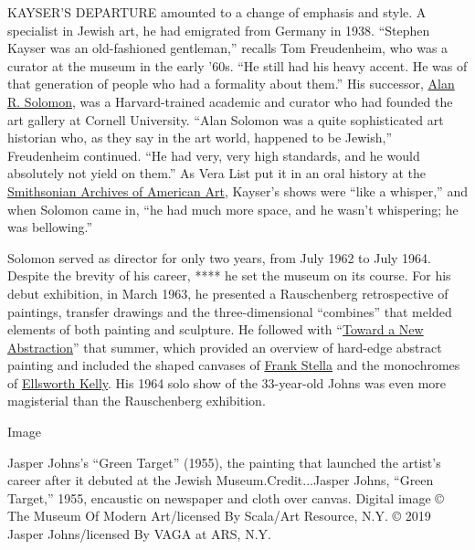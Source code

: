 KAYSER'S DEPARTURE amounted to a change of emphasis and style. A
specialist in Jewish art, he had emigrated from Germany in 1938.
``Stephen Kayser was an old-fashioned gentleman,'' recalls Tom
Freudenheim, who was a curator at the museum in the early '60s. ``He
still had his heavy accent. He was of that generation of people who had
a formality about them.'' His successor,
\href{https://www.nytimes.com/1970/03/01/archives/alan-r-solomon-19201970.html}{Alan
R. Solomon}, was a Harvard-trained academic and curator who had founded
the art gallery at Cornell University. ``Alan Solomon was a quite
sophisticated art historian who, as they say in the art world, happened
to be Jewish,'' Freudenheim continued. ``He had very, very high
standards, and he would absolutely not yield on them.'' As Vera List put
it in an oral history at the \href{https://www.aaa.si.edu/}{Smithsonian
Archives of American Art}, Kayser's shows were ``like a whisper,'' and
when Solomon came in, ``he had much more space, and he wasn't
whispering; he was bellowing.''

Solomon served as director for only two years, from July 1962 to July
1964. Despite the brevity of his career, **** he set the museum on its
course. For his debut exhibition, in March 1963, he presented a
Rauschenberg retrospective of paintings, transfer drawings and the
three-dimensional ``combines'' that melded elements of both painting and
sculpture. He followed with
``\href{https://www.amazon.com/Toward-Abstraction-Heller-Steinberg-Solomon/dp/B000PSXR2A}{Toward
a New Abstraction}'' that summer, which provided an overview of
hard-edge abstract painting and included the shaped canvases of
\href{https://www.nytimes.com/2020/03/18/t-magazine/frank-stella.html}{Frank
Stella} and the monochromes of
\href{https://www.nytimes.com/2018/02/08/t-magazine/ellsworth-kelly-austin-last-work.html}{Ellsworth
Kelly}. His 1964 solo show of the 33-year-old Johns was even more
magisterial than the Rauschenberg exhibition.

Image

Jasper Johns's ``Green Target'' (1955), the painting that launched the
artist's career after it debuted at the Jewish Museum.Credit...Jasper
Johns, ``Green Target,'' 1955, encaustic on newspaper and cloth over
canvas. Digital image © The Museum Of Modern Art/licensed By Scala/Art
Resource, N.Y. © 2019 Jasper Johns/licensed By VAGA at ARS, N.Y.


